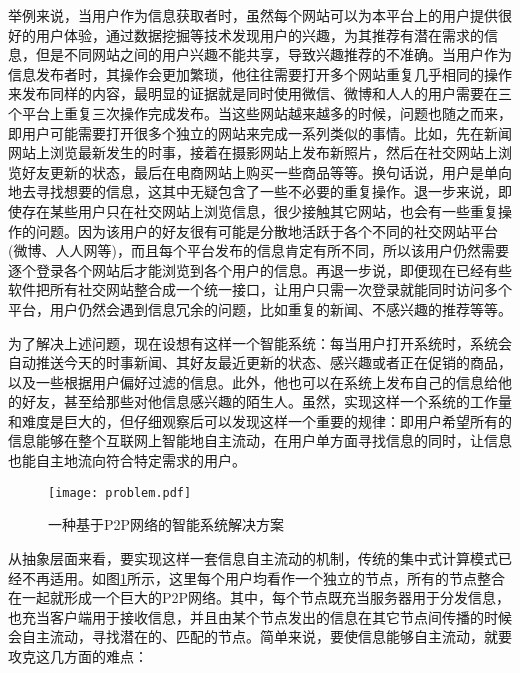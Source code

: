 举例来说，当用户作为信息获取者时，虽然每个网站可以为本平台上的用户提供很好的用户体验，通过数据挖掘等技术发现用户的兴趣，为其推荐有潜在需求的信息，但是不同网站之间的用户兴趣不能共享，导致兴趣推荐的不准确。当用户作为信息发布者时，其操作会更加繁琐，他往往需要打开多个网站重复几乎相同的操作来发布同样的内容，最明显的证据就是同时使用微信、微博和人人的用户需要在三个平台上重复三次操作完成发布。当这些网站越来越多的时候，问题也随之而来，即用户可能需要打开很多个独立的网站来完成一系列类似的事情。比如，先在新闻网站上浏览最新发生的时事，接着在摄影网站上发布新照片，然后在社交网站上浏览好友更新的状态，最后在电商网站上购买一些商品等等。换句话说，用户是单向地去寻找想要的信息，这其中无疑包含了一些不必要的重复操作。退一步来说，即使存在某些用户只在社交网站上浏览信息，很少接触其它网站，也会有一些重复操作的问题。因为该用户的好友很有可能是分散地活跃于各个不同的社交网站平台(微博、人人网等)，而且每个平台发布的信息肯定有所不同，所以该用户仍然需要逐个登录各个网站后才能浏览到各个用户的信息。再退一步说，即便现在已经有些软件把所有社交网站整合成一个统一接口，让用户只需一次登录就能同时访问多个平台，用户仍然会遇到信息冗余的问题，比如重复的新闻、不感兴趣的推荐等等。

为了解决上述问题，现在设想有这样一个智能系统：每当用户打开系统时，系统会自动推送今天的时事新闻、其好友最近更新的状态、感兴趣或者正在促销的商品，以及一些根据用户偏好过滤的信息。此外，他也可以在系统上发布自己的信息给他的好友，甚至给那些对他信息感兴趣的陌生人。虽然，实现这样一个系统的工作量和难度是巨大的，但仔细观察后可以发现这样一个重要的规律：即用户希望所有的信息能够在整个互联网上智能地自主流动，在用户单方面寻找信息的同时，让信息也能自主地流向符合特定需求的用户。

\begin{figure}
\centering
\texttt{[image: problem.pdf]}
\caption{一种基于P2P网络的智能系统解决方案}
\label{fig:solution}
\end{figure}

从抽象层面来看，要实现这样一套信息自主流动的机制，传统的集中式计算模式已经不再适用。如图\ref{fig:solution}所示，这里每个用户均看作一个独立的节点，所有的节点整合在一起就形成一个巨大的P2P网络。其中，每个节点既充当服务器用于分发信息，也充当客户端用于接收信息，并且由某个节点发出的信息在其它节点间传播的时候会自主流动，寻找潜在的、匹配的节点。简单来说，要使信息能够自主流动，就要攻克这几方面的难点：

